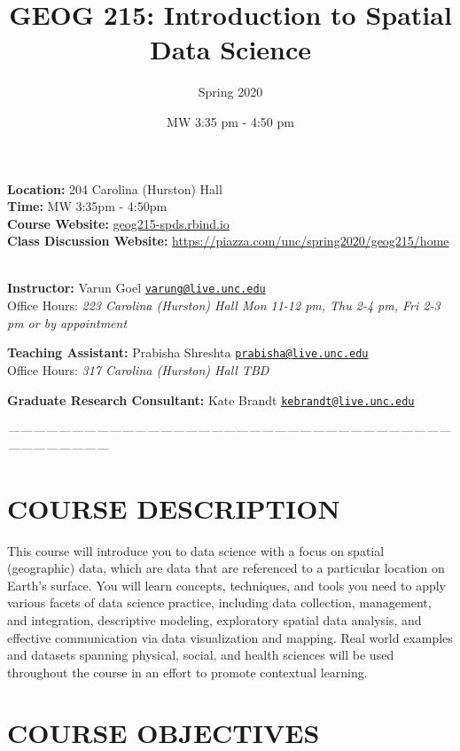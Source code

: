 \documentclass[11pt,]{article}
\title{GEOG 215: Introduction to Spatial Data Science}
\author{Spring 2020}
\date{MW 3:35 pm - 4:50 pm}
\begin{document}
\maketitle

\textbf{Location:} 204 Carolina (Hurston) Hall\\
\textbf{Time:} MW 3:35pm - 4:50pm\\
\textbf{Course Website:}
\href{https://geog215-spds.rbind.io}{geog215-spds.rbind.io}\\
\textbf{Class Discussion Website:}
\url{https://piazza.com/unc/spring2020/geog215/home} ~ ~

\textbf{Instructor:} Varun Goel \textbar{}
\href{mailto:varung@live.unc.edu}{\nolinkurl{varung@live.unc.edu}}\\
Office Hours: \emph{223 Carolina (Hurston) Hall \textbar{} Mon 11-12 pm,
Thu 2-4 pm, Fri 2-3 pm or by appointment}

\textbf{Teaching Assistant:} Prabisha Shreshta \textbar{}
\href{mailto:prabisha@live.unc.edu}{\nolinkurl{prabisha@live.unc.edu}}\\
Office Hours: \emph{317 Carolina (Hurston) Hall \textbar{} TBD}

\textbf{Graduate Research Consultant:} Kate Brandt \textbar{}
\href{mailto:kebrandt@live.unc.edu}{\nolinkurl{kebrandt@live.unc.edu}}

\emph{---------------------------------------------------------------------------------------------------------------------------------}

\hypertarget{course-description}{%
\section{COURSE DESCRIPTION}\label{course-description}}

This course will introduce you to data science with a focus on spatial
(geographic) data, which are data that are referenced to a particular
location on Earth's surface. You will learn concepts, techniques, and
tools you need to apply various facets of data science practice,
including data collection, management, and integration, descriptive
modeling, exploratory spatial data analysis, and effective communication
via data visualization and mapping. Real world examples and datasets
spanning physical, social, and health sciences will be used throughout
the course in an effort to promote contextual learning.

\hypertarget{course-objectives}{%
\section{COURSE OBJECTIVES}\label{course-objectives}}
\end{document}
